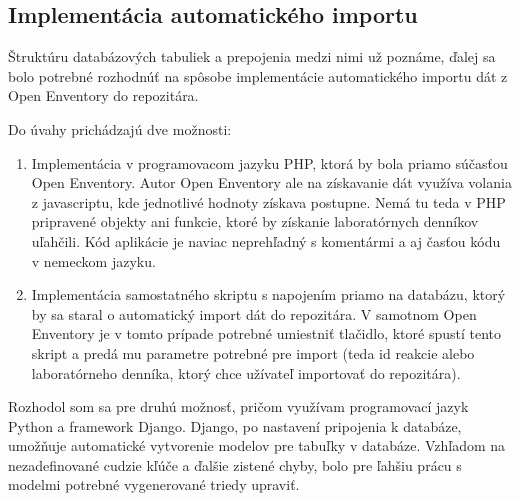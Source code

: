\documentclass[thesis=M,slovak]{FITthesis}[2013/05/06]
\begin{document}
\subsection{Implementácia automatického importu}
Štruktúru databázových tabuliek a prepojenia medzi nimi už poznáme, ďalej sa bolo potrebné rozhodnúť na spôsobe implementácie automatického importu dát z Open Enventory do repozitára.

Do úvahy prichádzajú dve možnosti:
\begin{enumerate}
	\item Implementácia v programovacom jazyku PHP, ktorá by bola priamo súčasťou Open Enventory. Autor Open Enventory ale na získavanie dát využíva volania z javascriptu, kde jednotlivé hodnoty získava postupne. Nemá tu teda v PHP pripravené objekty ani funkcie, ktoré by získanie laboratórnych denníkov uľahčili. Kód aplikácie je naviac neprehľadný s komentármi a aj časťou kódu v nemeckom jazyku.
	\item Implementácia samostatného skriptu s napojením priamo na databázu, ktorý by sa staral o automatický import dát do repozitára. V samotnom Open Enventory je v tomto prípade potrebné umiestniť tlačidlo, ktoré spustí tento skript a predá mu parametre potrebné pre import (teda id reakcie alebo laboratórneho denníka, ktorý chce užívateľ importovať do repozitára).
\end{enumerate}

Rozhodol som sa pre druhú možnosť, pričom využívam programovací jazyk Python a framework Django. Django, po nastavení pripojenia k databáze, umožňuje automatické vytvorenie modelov pre tabuľky v databáze. Vzhľadom na nezadefinované cudzie kľúče a ďalšie zistené chyby, bolo pre ľahšiu prácu s modelmi potrebné vygenerované triedy upraviť.
\end{document}
